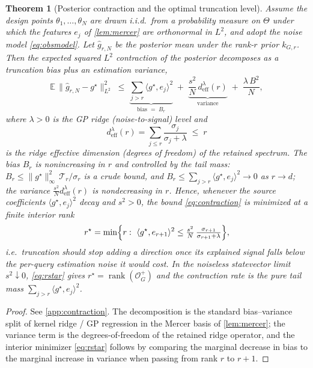 \documentclass[aps,prxquantum,reprint,amsmath,amssymb,floatfix,nofootinbib,superscriptaddress,longbibliography]{revtex4-2}
\newtheorem{theorem}{Theorem}
\theoremstyle{remark}
\newcommand{\calO}{\mathcal{O}}
\begin{document}
\begin{theorem}[Posterior contraction and the optimal truncation level]
\label{thm:contraction}
Assume the design points \(\theta_1,\dots,\theta_N\) are drawn i.i.d.\ from a
probability measure on \(\Theta\) under which the features \(e_j\) of
\cref{lem:mercer} are orthonormal in \(L^2\), and adopt the noise model
\eqref{eq:obsmodel}. Let \(\widehat g_{r,N}\) be the posterior mean under the
rank-\(r\) prior \(k_{G,r}\). Then the expected squared \(L^2\) contraction of the
posterior decomposes as a truncation \emph{bias} plus an estimation
\emph{variance},
\begin{equation}
    \mathbb E\,\bigl\|\widehat g_{r,N}-g^{\star}\bigr\|_{L^2}^2
    \;\le\;
    \underbrace{\sum_{j>r}\langle g^{\star},e_j\rangle^2}_{\text{bias }=\;B_r}
    \;+\;
    \underbrace{\frac{s^2}{N}\,d_{\mathrm{eff}}^{\lambda}(r)}_{\text{variance}}
    \;+\;\frac{\lambda\,B^2}{N},
    \label{eq:contraction}
\end{equation}
where \(\lambda>0\) is the GP ridge (noise-to-signal) level and
\begin{equation}
    d_{\mathrm{eff}}^{\lambda}(r)=\sum_{j\le r}\frac{\sigma_j}{\sigma_j+\lambda}
    \;\le\; r
    \label{eq:deff-ridge}
\end{equation}
is the ridge effective dimension (degrees of freedom) of the retained spectrum.
The bias \(B_r\) is nonincreasing in \(r\) and controlled by the tail mass:
\(B_r\le \|g^{\star}\|_\infty^2\,\mathcal T_r/\sigma_{r}\) is a crude bound, and
\(B_r\le\sum_{j>r}\langle g^\star,e_j\rangle^2\to0\) as \(r\to d\); the variance
\(\tfrac{s^2}{N}d_{\mathrm{eff}}^{\lambda}(r)\) is nondecreasing in \(r\).
Hence, whenever the source coefficients \(\langle g^{\star},e_j\rangle^2\) decay
and \(s^2>0\), the bound \eqref{eq:contraction} is minimized at a finite interior
rank
\begin{equation}
    r^{\star}=\min\Bigl\{r:\ \langle g^{\star},e_{r+1}\rangle^2
    \le \tfrac{s^2}{N}\,\tfrac{\sigma_{r+1}}{\sigma_{r+1}+\lambda}\Bigr\},
    \label{eq:rstar}
\end{equation}
i.e.\ truncation should stop adding a direction once its explained signal falls
below the per-query estimation noise it would cost.  In the noiseless statevector
limit \(s^2\downarrow0\), \eqref{eq:rstar} gives \(r^{\star}=\operatorname{rank}
(\calO_G^{+})\) and the contraction rate is the pure tail mass
\(\sum_{j>r}\langle g^\star,e_j\rangle^2\).
\end{theorem}

\begin{proof}
See \cref{app:contraction}. The decomposition is the standard bias--variance
split of kernel ridge / GP regression in the Mercer basis of \cref{lem:mercer};
the variance term is the degrees-of-freedom of the retained ridge operator, and
the interior minimizer \eqref{eq:rstar} follows by comparing the marginal decrease
in bias to the marginal increase in variance when passing from rank \(r\) to
\(r+1\).
\end{proof}
\end{document}
